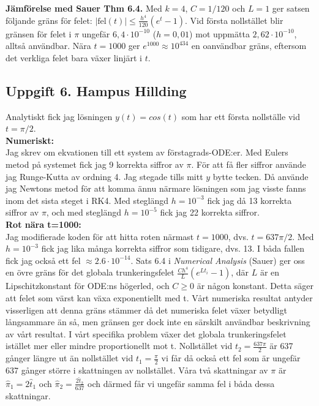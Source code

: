 \documentclass{article}
\begin{document}
\medskip
\textbf{Jämförelse med Sauer Thm 6.4.} Med $k = 4$, $C = 1/120$ och $L = 1$ ger satsen följande gräns för felet:
$|\text{fel}(t)| \leq \tfrac{h^4}{120}(e^{t} - 1)$. Vid första nollstället blir
gränsen för felet i $\pi$ ungefär $6{,}4 \cdot 10^{-10}$ ($h = 0{,}01$) mot uppmätta
$2{,}62 \cdot 10^{-10}$, alltså användbar. Nära $t = 1000$ ger $e^{1000} \approx 10^{434}$
en oanvändbar gräns, eftersom det verkliga felet bara växer linjärt i $t$.

\subsection*{Uppgift 6. Hampus Hillding}
Analytiskt fick jag lösningen $y(t)=cos(t)$ som har ett första nollställe vid $t=\pi/2$. \\
\textbf{Numeriskt:} \\
Jag skrev om ekvationen till ett system av förstagrads-ODE:er. Med Eulers metod på systemet fick jag 9 korrekta siffror av $\pi$. För att få fler siffror använde jag Runge-Kutta av ordning 4. Jag stegade tills mitt $y$ bytte tecken. Då använde jag Newtons metod för att komma ännu närmare lösningen som jag visste fanns inom det sista steget i RK4. Med steglängd $h=10^{-3}$ fick jag då 13 korrekta siffror av $\pi$, och med steglängd $h=10^{-5}$ fick jag 22 korrekta siffror.\\
\textbf{Rot nära t=1000:}\\
Jag modifierade koden för att hitta roten närmast $t=1000$, dvs. $t=637\pi/2$. Med $h=10^{-3}$ fick jag lika många korrekta siffror som tidigare, dvs. 13. I båda fallen fick jag också ett fel $\approx2.6\cdot10^{-14}$. Sats 6.4 i \textit{Numerical Analysis} (Sauer) ger oss en övre gräns för det globala trunkeringsfelet $\frac{Ch^4}{L}(e^{Lt_i}-1)$, där $L$ är en Lipschitzkonstant för ODE:ns högerled, och $C \geq 0$ är någon konstant. Detta säger att felet som värst kan växa exponentiellt med t. Vårt numeriska resultat antyder visserligen att denna gräns stämmer då det numeriska felet växer betydligt långsammare än så, men gränsen ger dock inte en särskilt användbar beskrivning av vårt resultat. I vårt specifika problem växer det globala trunkeringsfelet istället mer eller mindre proportionellt mot t. Nollstället vid $t_2=\frac{637\pi}{2}$ är 637 gånger längre ut än nollstället vid $t_1=\frac{\pi}{2}$ vi får då också ett fel som är ungefär 637 gånger större i skattningen av nollstället. Våra två skattningar av $\pi$ är $\hat{\pi}_1 = 2\hat{t}_1$ och $\hat{\pi}_2 = \frac{2\hat{t}_2}{637}$ och därmed får vi ungefär samma fel i båda dessa skattningar.
\end{document}
